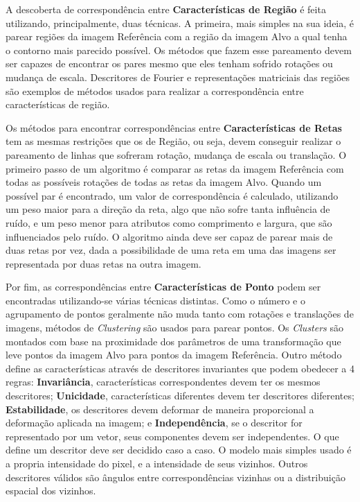     A descoberta de correspondência entre \textbf{Características de Região} é feita utilizando, principalmente, duas 
técnicas. A primeira, mais simples na sua ideia, é parear regiões da imagem Referência com a região da imagem Alvo a 
qual tenha o contorno mais parecido possível. Os métodos que fazem esse pareamento devem ser capazes de encontrar os 
pares mesmo que eles tenham sofrido rotações ou mudança de escala. Descritores de Fourier e representações matriciais 
das regiões são exemplos de métodos usados para realizar a correspondência entre características de região.

    Os métodos para encontrar correspondências entre \textbf{Características de Retas} tem as mesmas restrições que os
de Região, ou seja, devem conseguir realizar o pareamento de linhas que sofreram rotação, mudança de escala ou 
translação. O primeiro passo de um algoritmo é comparar as retas da imagem Referência com todas as possíveis rotações 
de todas as retas da imagem Alvo. Quando um possível par é encontrado, um valor de correspondência é calculado, 
utilizando um peso maior para a direção da reta, algo que não sofre tanta influência de ruído, e um peso menor para 
atributos como comprimento e largura, que são influenciados pelo ruído. O algoritmo ainda deve ser capaz de parear mais 
de duas retas por vez, dada a possibilidade de uma reta em uma das imagens ser representada por duas retas na outra 
imagem.

    Por fim, as correspondências entre \textbf{Características de Ponto} podem ser encontradas utilizando-se várias 
técnicas distintas. Como o número e o agrupamento de pontos geralmente não muda tanto com rotações e translações de 
imagens, métodos de \textit{Clustering} são usados para parear pontos. Os \textit{Clusters} são montados com base na 
proximidade dos parâmetros de uma transformação que leve pontos da imagem Alvo para pontos da imagem Referência. Outro 
método define as características através de descritores invariantes que podem obedecer a 4 regras: \textbf{Invariância}, 
características correspondentes devem ter os mesmos descritores; \textbf{Unicidade}, características diferentes devem 
ter descritores diferentes; \textbf{Estabilidade}, os descritores devem deformar de maneira proporcional a deformação
aplicada na imagem; e \textbf{Independência}, se o descritor for representado por um vetor, seus componentes devem ser 
independentes. O que define um descritor deve ser decidido caso a caso. O modelo mais simples usado é a propria 
intensidade do pixel, e a intensidade de seus vizinhos. Outros descritores válidos são ângulos entre correspondências 
vizinhas ou a distribuição espacial dos vizinhos.

